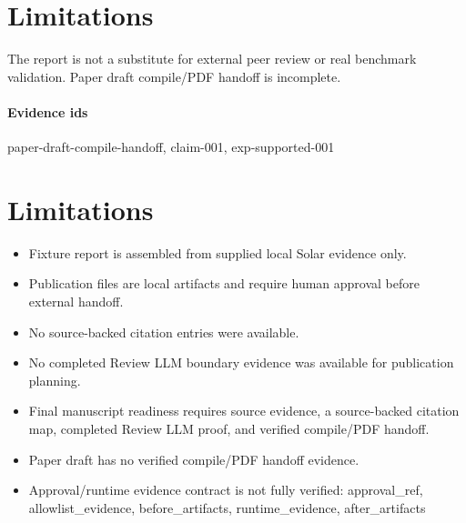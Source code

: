 \documentclass{article}
\begin{document}
\section{Limitations}
The report is not a substitute for external peer review or real benchmark validation. Paper draft compile/PDF handoff is incomplete.

\paragraph{Evidence ids} paper-draft-compile-handoff, claim-001, exp-supported-001

\section{Limitations}

\begin{itemize}\item Fixture report is assembled from supplied local Solar evidence only.\end{itemize}
\begin{itemize}\item Publication files are local artifacts and require human approval before external handoff.\end{itemize}
\begin{itemize}\item No source-backed citation entries were available.\end{itemize}
\begin{itemize}\item No completed Review LLM boundary evidence was available for publication planning.\end{itemize}
\begin{itemize}\item Final manuscript readiness requires source evidence, a source-backed citation map, completed Review LLM proof, and verified compile/PDF handoff.\end{itemize}
\begin{itemize}\item Paper draft has no verified compile/PDF handoff evidence.\end{itemize}
\begin{itemize}\item Approval/runtime evidence contract is not fully verified: approval\_ref, allowlist\_evidence, before\_artifacts, runtime\_evidence, after\_artifacts\end{itemize}
\end{document}
